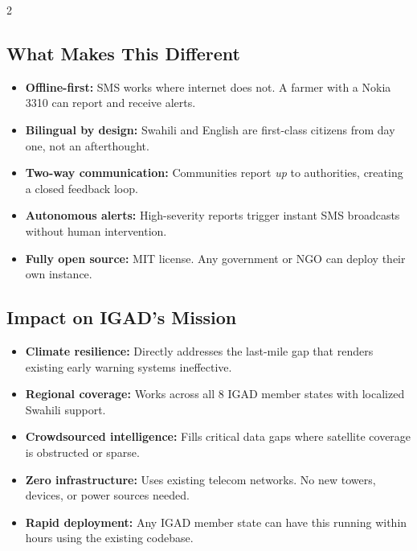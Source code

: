 \documentclass[11pt,a4paper]{article}
\begin{document}
\begin{multicols}{2}

\subsection{What Makes This Different}
\begin{itemize}[leftmargin=1.2em]
  \item \textbf{Offline-first:} SMS works where internet does not. A farmer with a Nokia 3310 can report and receive alerts.
  \item \textbf{Bilingual by design:} Swahili and English are first-class citizens from day one, not an afterthought.
  \item \textbf{Two-way communication:} Communities report \textit{up} to authorities, creating a closed feedback loop.
  \item \textbf{Autonomous alerts:} High-severity reports trigger instant SMS broadcasts without human intervention.
  \item \textbf{Fully open source:} MIT license. Any government or NGO can deploy their own instance.
\end{itemize}

\columnbreak

\subsection{Impact on IGAD's Mission}
\begin{itemize}[leftmargin=1.2em]
  \item \textbf{Climate resilience:} Directly addresses the last-mile gap that renders existing early warning systems ineffective.
  \item \textbf{Regional coverage:} Works across all 8 IGAD member states with localized Swahili support.
  \item \textbf{Crowdsourced intelligence:} Fills critical data gaps where satellite coverage is obstructed or sparse.
  \item \textbf{Zero infrastructure:} Uses existing telecom networks. No new towers, devices, or power sources needed.
  \item \textbf{Rapid deployment:} Any IGAD member state can have this running within hours using the existing codebase.
\end{itemize}

\end{multicols}

\end{document}
